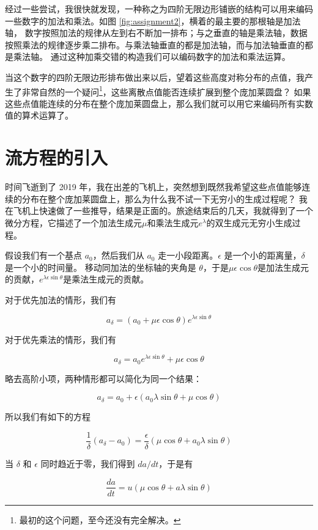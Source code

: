 \documentclass[a4paper,12pt]{book}
\numberwithin{problem}{section}
\numberwithin{definition}{section}
\numberwithin{lemma}{section}
\numberwithin{proposition}{section}
\numberwithin{theorem}{section}
\numberwithin{grammar}{section}
\numberwithin{program}{section}
\numberwithin{convention}{section}
\numberwithin{corollary}{section}
\begin{document}
经过一些尝试，我很快就发现，一种称之为四阶无限边形铺嵌的结构可以用来编码一些数字的加法和乘法。如图 \ref{fig:assignment2}，横着的最主要的那根轴是加法轴，
数字按照加法的规律从左到右不断加一排布；与之垂直的轴是乘法轴，数据按照乘法的规律逐步乘二排布。与乘法轴垂直的都是加法轴，而与加法轴垂直的都是乘法轴。
通过这种加乘交错的构造我们可以编码数字的加法和乘法运算。

当这个数字的四阶无限边形排布做出来以后，望着这些高度对称分布的点值，我产生了非常自然的一个疑问\footnote{最初的这个问题，至今还没有完全解决。}，这些离散点值能否连续扩展到整个庞加莱圆盘？
如果这些点值能连续的分布在整个庞加莱圆盘上，那么我们就可以用它来编码所有实数值的算术运算了。

\section{流方程的引入}

时间飞逝到了 2019 年，我在出差的飞机上，突然想到既然我希望这些点值能够连续的分布在整个庞加莱圆盘上，那么为什么我不试一下无穷小的生成过程呢？
我在飞机上快速做了一些推导，结果是正面的。旅途结束后的几天，我就得到了一个微分方程，它描述了一个加法生成元$\mu$和乘法生成元$e^\lambda$的双生成元无穷小生成过程。

假设我们有一个基点 $a_0$，然后我们从 $a_0$ 走一小段距离。$\epsilon$ 是一个小的距离量，$\delta$ 是一个小的时间量。
移动同加法的坐标轴的夹角是 $\theta$，于是$\mu \epsilon \cos \theta$是加法生成元的贡献，$e^{\lambda \epsilon \sin \theta}$是乘法生成元的贡献。

对于优先加法的情形，我们有

\[
a_{\delta} = (a_0 + \mu \epsilon \cos \theta)e^{\lambda \epsilon \sin \theta}
\]

对于优先乘法的情形，我们有

\[
a_{\delta} = a_0 e^{\lambda \epsilon \sin \theta} + \mu \epsilon \cos \theta
\]

略去高阶小项，两种情形都可以简化为同一个结果：

\[
a_{\delta} = a_0 + \epsilon (a_0 \lambda \sin \theta + \mu \cos \theta)
\]

所以我们有如下的方程

\[
\frac{1}{\delta} (a_{\delta} - a_0) = \frac{\epsilon}{\delta} (\mu \cos \theta + a_0 \lambda \sin \theta)
\]

当 $\delta$ 和 $\epsilon$ 同时趋近于零，我们得到 $da / dt$，于是有

\[
\frac{da}{dt} = u (\mu \cos \theta + a \lambda \sin \theta)
\]
\end{document}
